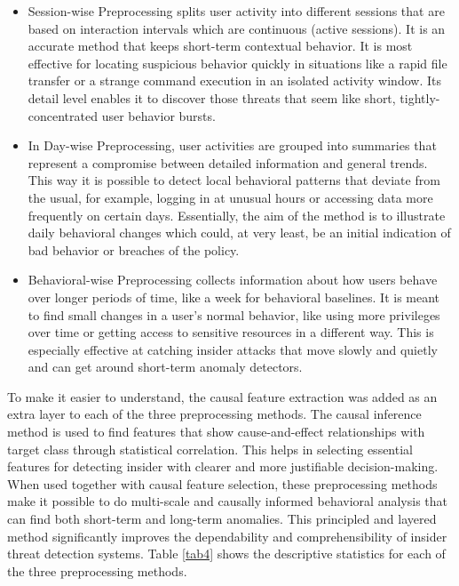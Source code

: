 \begin{itemize}
    \item Session-wise Preprocessing splits user activity into different sessions that are based on interaction intervals which are continuous (active sessions). It is an accurate method that keeps short-term contextual behavior. It is most effective for locating suspicious behavior quickly in situations like a rapid file transfer or a strange command execution in an isolated activity window. Its detail level enables it to discover those threats that seem like short, tightly-concentrated user behavior bursts.

    \item In Day-wise Preprocessing, user activities are grouped into summaries that represent a compromise between detailed information and general trends. This way it is possible to detect local behavioral patterns that deviate from the usual, for example, logging in at unusual hours or accessing data more frequently on certain days. Essentially, the aim of the method is to illustrate daily behavioral changes which could, at very least, be an initial indication of bad behavior or breaches of the policy.

\item Behavioral-wise Preprocessing collects information about how users behave over longer periods of time, like a week for behavioral baselines. It is meant to find small changes in a user's normal behavior, like using more privileges over time or getting access to sensitive resources in a different way.  This is especially effective at catching insider attacks that move slowly and quietly and can get around short-term anomaly detectors.
\end{itemize}



To make it easier to understand, the causal feature extraction was added as an extra layer to each of the three preprocessing methods.  The causal inference method is used to find features that show cause-and-effect relationships with target class through statistical correlation.  This helps in selecting essential features for detecting insider with clearer and more justifiable decision-making. When used together with causal feature selection, these preprocessing methods make it possible to do multi-scale and causally informed behavioral analysis that can find both short-term and long-term anomalies.  This principled and layered method significantly improves the dependability and comprehensibility of insider threat detection systems.  Table \ref{tab4} shows the descriptive statistics for each of the three preprocessing methods.

